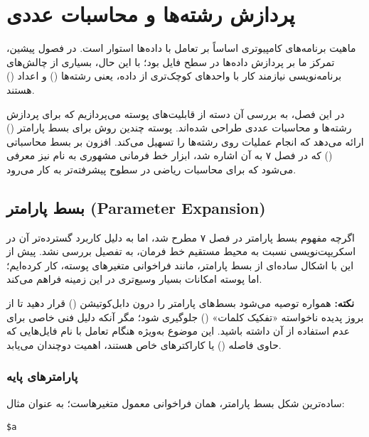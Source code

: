 \chapter{پردازش رشته‌ها و محاسبات عددی}

ماهیت برنامه‌های کامپیوتری اساساً بر تعامل با داده‌ها استوار است. در فصول پیشین، تمرکز ما بر پردازش داده‌ها در سطح فایل بود؛ با این حال، بسیاری از چالش‌های برنامه‌نویسی نیازمند کار با واحدهای کوچک‌تری از داده، یعنی رشته‌ها () و اعداد () هستند.

در این فصل، به بررسی آن دسته از قابلیت‌های پوسته می‌پردازیم که برای پردازش رشته‌ها و محاسبات عددی طراحی شده‌اند. پوسته چندین روش برای بسط پارامتر () ارائه می‌دهد که انجام عملیات روی رشته‌ها را تسهیل می‌کند. افزون بر بسط محاسباتی () که در فصل ۷ به آن اشاره شد، ابزار خط فرمانی مشهوری به نام  نیز معرفی می‌شود که برای محاسبات ریاضی در سطوح پیشرفته‌تر به کار می‌رود.

\section{بسط پارامتر (Parameter Expansion)}

اگرچه مفهوم بسط پارامتر در فصل ۷ مطرح شد، اما به دلیل کاربرد گسترده‌تر آن در اسکریپت‌نویسی نسبت به محیط مستقیم خط فرمان، به تفصیل بررسی نشد. پیش از این با اشکال ساده‌ای از بسط پارامتر، مانند فراخوانی متغیرهای پوسته، کار کرده‌ایم؛ اما پوسته امکانات بسیار وسیع‌تری در این زمینه فراهم می‌کند.

\begin{note}
\textbf{نکته:} همواره توصیه می‌شود بسط‌های پارامتر را درون دابل‌کوتیشن () قرار دهید تا از بروز پدیده ناخواسته «تفکیک کلمات» () جلوگیری شود؛ مگر آنکه دلیل فنی خاصی برای عدم استفاده از آن داشته باشید. این موضوع به‌ویژه هنگام تعامل با نام فایل‌هایی که حاوی فاصله () یا کاراکترهای خاص هستند، اهمیت دوچندان می‌یابد.
\end{note}

\subsection{پارامترهای پایه}

ساده‌ترین شکل بسط پارامتر، همان فراخوانی معمول متغیرهاست؛ به عنوان مثال:

\begin{latin}
\begin{lstlisting}
$a
\end{lstlisting}
\end{latin}

